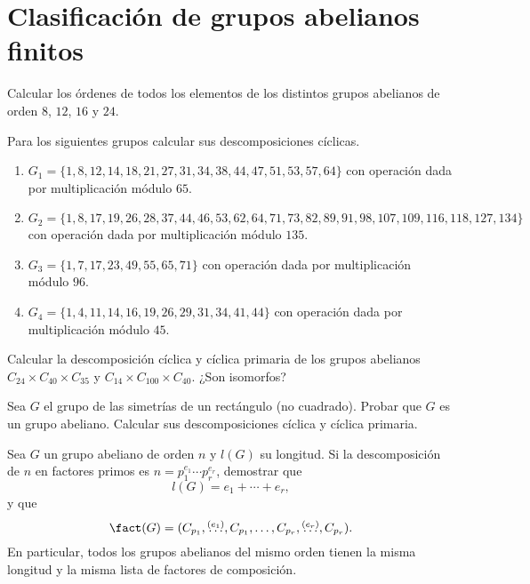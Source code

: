 \section{Clasificación de grupos abelianos finitos}

\begin{ejercicio}\label{ej:7.1}
    Calcular los órdenes de todos los elementos de los distintos grupos abelianos de orden $8$, $12$, $16$ y $24$.
\end{ejercicio}

\begin{ejercicio}\label{ej:7.2}
    Para los siguientes grupos calcular sus descomposiciones cíclicas.
    \begin{enumerate}
        \item $G_1 = \{1, 8, 12, 14, 18, 21, 27, 31, 34, 38, 44, 47, 51, 53, 57, 64\}$ con operación dada por multiplicación módulo $65$.
        \item $G_2 = \{1, 8, 17, 19, 26, 28, 37, 44, 46, 53, 62, 64, 71, 73, 82, 89, 91, 98, 107,109, 116, 118, 127, 134\}$ con operación dada por multiplicación módulo $135$.
        \item $G_3 = \{1, 7, 17, 23, 49, 55, 65, 71\}$ con operación dada por multiplicación módulo $96$.
        \item $G_4 = \{1, 4, 11, 14, 16, 19, 26, 29, 31, 34, 41, 44\}$ con operación dada por multiplicación módulo $45$.
    \end{enumerate}
\end{ejercicio}

\begin{ejercicio}\label{ej:7.3}
    Calcular la descomposición cíclica y cíclica primaria de los grupos abelianos $C_{24} \times C_{40} \times C_{35}$ y $C_{14} \times C_{100} \times C_{40}$. ¿Son isomorfos?
\end{ejercicio}

\begin{ejercicio}\label{ej:7.4}
    Sea $G$ el grupo de las simetrías de un rectángulo (no cuadrado). Probar que $G$ es un grupo abeliano. Calcular sus descomposiciones cíclica y cíclica primaria.
\end{ejercicio}

\begin{ejercicio}\label{ej:7.5}
    Sea $G$ un grupo abeliano de orden $n$ y $l(G)$ su longitud. Si la descomposición de $n$ en factores primos es $n = p_1^{e_1} \cdots p_r^{e_r}$, demostrar que
    \begin{equation*}
        l(G) = e_1 + \cdots + e_r,
    \end{equation*}
    y que
    \begin{equation*}
        \fact(G) = (C_{p_1},\stackrel{(e_1)}{\ldots}, C_{p_1}, \ldots, C_{p_r},\stackrel{(e_r)}{\ldots}, C_{p_r}).
    \end{equation*}
    En particular, todos los grupos abelianos del mismo orden tienen la misma longitud y la misma lista de factores de composición.
\end{ejercicio}

